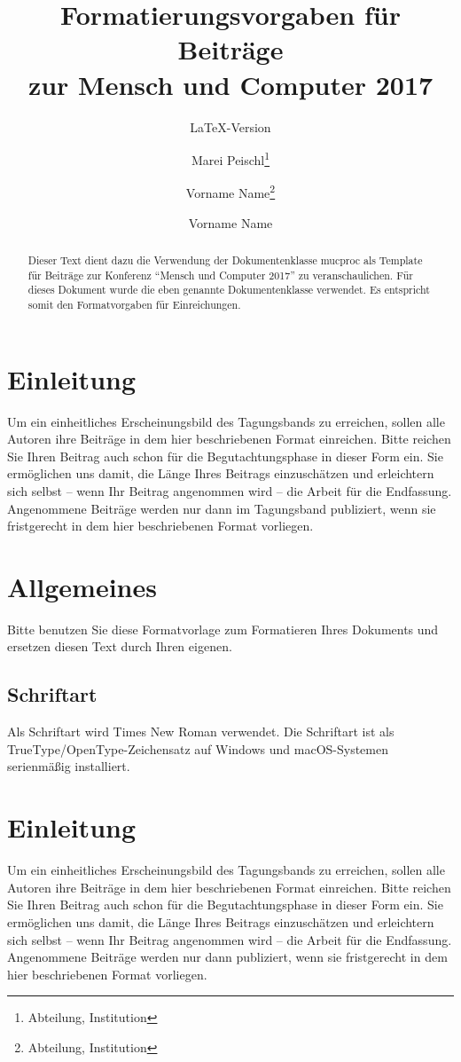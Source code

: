 \documentclass[ngerman]{mucproc}
\title{Formatierungsvorgaben für Beiträge\\
	zur Mensch und Computer 2017}%
\subtitle{\LaTeX-Version}%
\author{Marei Peischl\thanks[inst1]{Abteilung, Institution}\and Vorname Name\thanks{Abteilung, Institution}\and Vorname Name\thanksref{inst1}}
\begin{document}
	
\maketitle

	
\begin{abstract}
Dieser Text dient dazu die Verwendung der Dokumentenklasse \textsf{mucproc} als Template für Beiträge zur Konferenz \enquote{Mensch und Computer 2017} zu veranschaulichen. Für dieses Dokument wurde die eben genannte Dokumentenklasse verwendet. Es entspricht somit den Formatvorgaben für Einreichungen.
\end{abstract}

\section{Einleitung}
Um ein einheitliches Erscheinungsbild des Tagungsbands zu erreichen, sollen alle Autoren ihre Beiträge in dem hier beschriebenen Format einreichen. Bitte reichen Sie Ihren Beitrag auch schon für die Begutachtungsphase in dieser Form ein. Sie ermöglichen uns damit, die Länge Ihres Beitrags einzuschätzen und erleichtern sich selbst – wenn Ihr Beitrag angenommen wird – die Arbeit für die Endfassung. Angenommene Beiträge werden nur dann im Tagungsband publiziert, wenn sie fristgerecht in dem hier beschriebenen Format vorliegen.
\section{Allgemeines}
Bitte benutzen Sie diese Formatvorlage zum Formatieren Ihres Dokuments und ersetzen diesen Text durch Ihren eigenen.
\subsection{Schriftart}
Als Schriftart wird Times New Roman verwendet. Die Schriftart ist als TrueType/OpenType-Zeichensatz auf Windows und macOS-Systemen serienmäßig installiert.


\section{Einleitung}
Um ein einheitliches Erscheinungsbild des Tagungsbands zu erreichen, sollen alle Autoren ihre Beiträge in dem hier beschriebenen Format einreichen. Bitte reichen Sie Ihren Beitrag auch schon für die Begutachtungsphase in dieser Form ein. Sie ermöglichen uns damit, die Länge Ihres Beitrags einzuschätzen und erleichtern sich selbst -- wenn Ihr Beitrag angenommen wird -- die Arbeit für die Endfassung. Angenommene Beiträge werden nur dann publiziert, wenn sie fristgerecht in dem hier beschriebenen Format vorliegen.
\end{document}
